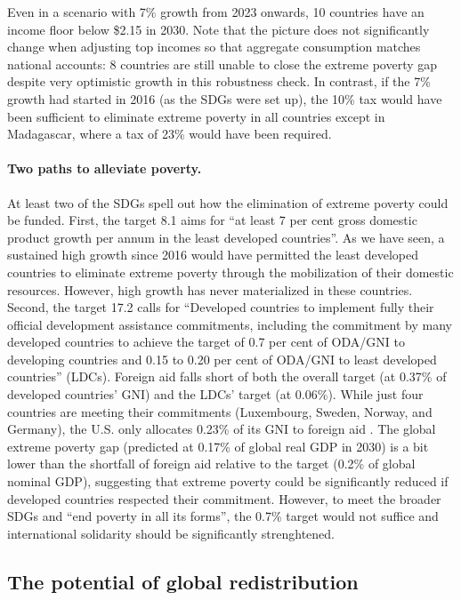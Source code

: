 \documentclass[12pt,english]{article}
\begin{document}
Even in a scenario with 7\% growth from 2023 onwards, 10 countries have an income floor below \$2.15 in 2030. Note that the picture does not significantly change when adjusting top incomes so that aggregate consumption matches national accounts: %
8 countries are still unable to close the extreme poverty gap despite very optimistic growth in this robustness check. In contrast, if the 7\% growth had started in 2016 (as the SDGs were set up), the 10\% tax would have been sufficient to eliminate extreme poverty in all countries except in Madagascar, where a tax of 23\% would have been required.

\paragraph{Two paths to alleviate poverty.}
At least two of the SDGs spell out how the elimination of extreme poverty could be funded. %
First, the target 8.1 aims for ``at least 7 per cent gross domestic product growth per annum in the least developed countries''. As we have seen, a sustained high growth since 2016 would have permitted the least developed countries to eliminate extreme poverty through the mobilization of their domestic resources. However, high growth has never materialized in these countries. 
Second, the target 17.2 calls for ``Developed countries to implement fully their official development assistance commitments, including the commitment by many developed countries to achieve the target of 0.7 per cent of ODA/GNI to developing countries and 0.15 to 0.20 per cent of ODA/GNI to least developed countries'' (LDCs). Foreign aid falls short of both the overall target (at 0.37\% of developed countries' GNI) and the LDCs' target (at 0.06\%). While just four countries are meeting their commitments (Luxembourg, Sweden, Norway, and Germany), the U.S. only allocates 0.23\% of its GNI to foreign aid \citep{oecd_oda_2023}. The global extreme poverty gap (predicted at 0.17\% of global real GDP in 2030) is a bit lower than the shortfall of foreign aid relative to the target (0.2\% of global nominal GDP), suggesting that extreme poverty could be significantly reduced if developed countries respected their commitment. %
However, to meet the broader SDGs and ``end poverty in all its forms'', the 0.7\% target would not suffice and international solidarity should be significantly strenghtened. %

\subsection{The potential of global redistribution\label{subsec:global}} %
\end{document}
